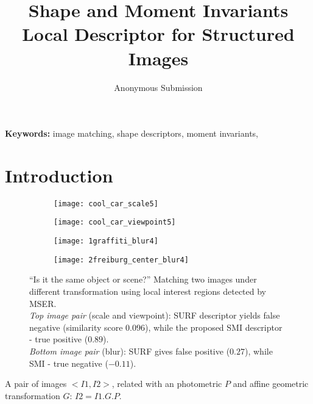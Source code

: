 \documentclass[a4paper,11pt]{article}
\begin{document}
\title{Shape and Moment Invariants Local Descriptor for Structured Images}

\author{Anonymous Submission}

\date{}
\maketitle
\thispagestyle{empty}



\begin{abstract}


\end{abstract}
\textbf{Keywords:} image matching, shape descriptors, moment invariants, 



\section{Introduction}
 
\begin{wrapfigure}{r}{0.5\textwidth}
 \vspace{-20pt} 
\begin{center}
\begin{subfigure}[b]{0.247\textwidth}
  \texttt{[image: cool\_car\_scale5]}
\end{subfigure}
\begin{subfigure}[b]{0.247\textwidth}
\texttt{[image: cool\_car\_viewpoint5]}
\end{subfigure}
\end{center}
\vspace{-20pt}
\begin{center}
\begin{subfigure}[b]{0.247\textwidth}
  \texttt{[image: 1graffiti\_blur4]}
\end{subfigure}
\begin{subfigure}[b]{0.247\textwidth}
\texttt{[image: 2freiburg\_center\_blur4]}
\end{subfigure}
\end{center}
\vspace{-20pt}
\caption{``Is it the same object or scene?'' Matching two images under different transformation using local interest regions detected by MSER.\\ {\em Top image pair} (scale and viewpoint): SURF descriptor yields false negative (similarity score $0.096$), while the proposed SMI descriptor - true positive ($0.89$).\\
{\em Bottom image pair} (blur): SURF gives false positive ($0.27$), while SMI - true negative ($-0.11$).}
  \vspace{-10pt}
\end{wrapfigure}\label{fig:intro1}
A pair of images $<I1, I2>$, related with an photometric $P$ and affine geometric transformation $G$: $I2=I1.G.P$.
\end{document}
